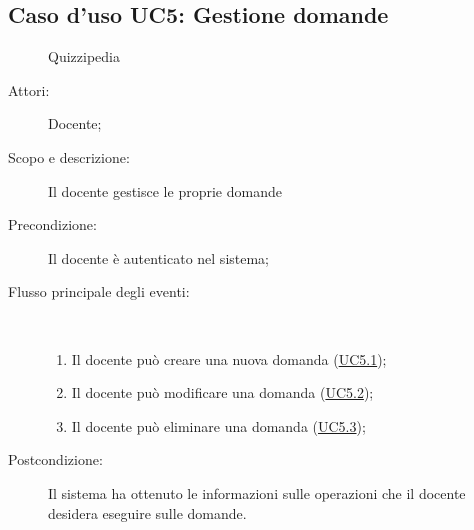 \subsection{Caso d'uso UC5: Gestione domande}
	\begin{figure}[H]
		\centering
		\begin{resizedtikzpicture}{\textwidth}
		\begin{umlsystem}[x=0, fill=lightgray!20]{Quizzipedia}
		\end{umlsystem}
		\end{resizedtikzpicture}
		\caption{}
	\end{figure}
\begin{description}
\item[Attori:] Docente;
\item[Scopo e descrizione:] Il docente gestisce le proprie domande
      \item[Precondizione:] Il docente è autenticato nel sistema;

        \item[Flusso principale degli eventi:] \ 
 \begin{enumerate}
          \item Il docente può creare una nuova domanda (\hyperlink{UC5.1}{UC5.1});
          \item Il docente può modificare una domanda (\hyperlink{UC5.2}{UC5.2});
          \item Il docente può eliminare una domanda (\hyperlink{UC5.3}{UC5.3});

      \end{enumerate}
    \item[Postcondizione:] Il sistema ha ottenuto le informazioni sulle operazioni che il docente desidera eseguire sulle domande.
  \end{description}
\hypertarget{UC5.1}{}
